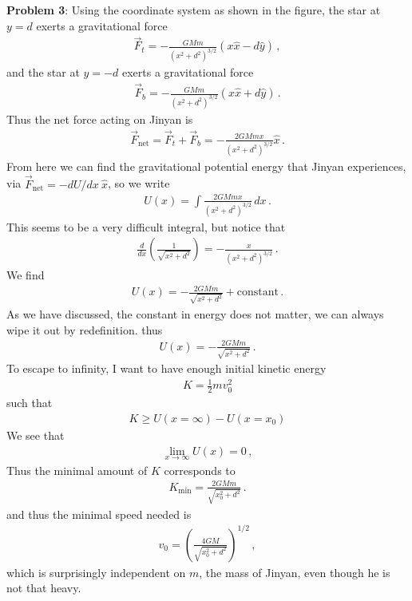 \documentclass[11pt]{article}
\begin{document}
\newpage
\noindent\textbf{Problem 3}: Using the coordinate system as shown in the figure, the star at $y = d$ exerts a gravitational force
\begin{align*}
\vec{F}_t = -\frac{GM m}{(x^2+d^2)^{3/2}} \left( x\hat{x}-d\hat{y}\right)\,,
\end{align*}
and the star at $y = -d$ exerts a gravitational force
\begin{align*}
\vec{F}_b = -\frac{GM m}{(x^2+d^2)^{3/2}} \left( x\hat{x}+d\hat{y}\right)\,.
\end{align*}
Thus the net force acting on Jinyan is 
\begin{align*}
\vec{F}_{\text{net}} = \vec{F}_t + \vec{F}_b = -\frac{2GM mx}{(x^2+d^2)^{3/2}} \hat{x}\,.
\end{align*}
From here we can find the gravitational potential energy that Jinyan experiences, via $\vec{F}_{\text{net}} = -dU/dx\ \hat{x}$, so we write 
\begin{align*}
U(x) = \int \frac{2GMmx}{(x^2 + d^2)^{3/2}}\, dx\,.
\end{align*}
This seems to be a very difficult integral, but notice that 
\begin{align*}
\frac{d}{dx}\left(\frac{1}{\sqrt{x^2 + d^2}}\right) = -\frac{x}{(x^2 + d^2)^{3/2}}\,.
\end{align*}
We find 
\begin{align*}
U(x) = -\frac{2GMm}{\sqrt{x^2 + d^2}} +\text{constant}\,.
\end{align*}
As we have discussed, the constant in energy does not matter, we can always wipe it out by redefinition. thus 
\begin{align*}
U(x) = -\frac{2GMm}{\sqrt{x^2 + d^2}}\,.
\end{align*}
To escape to infinity, I want to have enough initial kinetic energy 
\begin{align*}
K = \frac{1}{2}mv_0^2
\end{align*}
such that
\begin{align*}
K \geq U(x= \infty) - U(x=x_0)
\end{align*}
We see that
\begin{align*}
\lim_{x\to \infty} U(x) = 0\,,
\end{align*}
Thus the minimal amount of $K$ corresponds to 
\begin{align*}
K_{\min} = \frac{2GMm}{\sqrt{x_0^2 + d^2}}\,.
\end{align*}
and thus the minimal speed needed is
\begin{align*}
v_0 = \left(\frac{4GM}{\sqrt{x_0^2 + d^2}}\right)^{1/2}\,,
\end{align*}
which is surprisingly independent on $m$, the mass of Jinyan, even though he is not that heavy. \\
\end{document}
